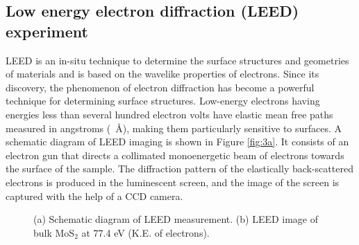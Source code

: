 \documentclass[12pt]{article}
\begin{document}
\subsection{Low energy electron diffraction (LEED) experiment}
LEED is an in-situ technique to determine the surface structures and geometries of materials and is based on the wavelike properties of electrons. Since its discovery, the phenomenon of electron diffraction has become a powerful technique for determining surface structures. Low-energy electrons having energies less than several hundred electron volts have elastic mean free paths measured in angstroms (\SI{}{\angstrom}), making them particularly sensitive to surfaces. A schematic diagram of LEED imaging is shown in Figure \ref{fig:3a}. It consists of an electron gun that directs a collimated monoenergetic beam of electrons towards the surface of the sample. The diffraction pattern of the elastically back-scattered electrons is produced in the luminescent screen, and the image of the screen is captured with the help of a CCD camera.


\begin{figure}[H]
\centering
{}\quad \hspace{45pt}
\caption{(a) Schematic diagram of LEED measurement. (b) LEED image of bulk MoS$_2$ at 77.4 eV (K.E. of electrons).}
\end{figure}
\end{document}
